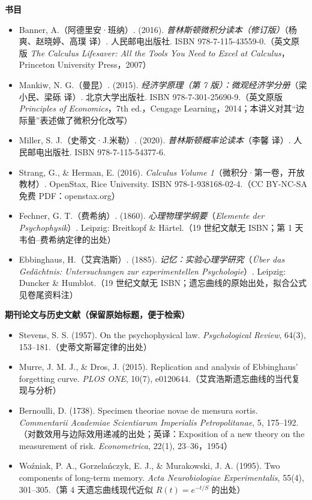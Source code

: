 \documentclass[UTF8,a4paper,11pt]{ctexart}
\begin{document}
\textbf{书目}
\begin{itemize}[label={}, leftmargin=2em, itemindent=-2em, itemsep=3pt]
  \item Banner, A.（阿德里安·班纳）. (2016). \emph{普林斯顿微积分读本（修订版）}（杨爽、赵晓婷、高璞 译）. 人民邮电出版社. ISBN 978-7-115-43559-0.（英文原版 \emph{The Calculus Lifesaver: All the Tools You Need to Excel at Calculus}，Princeton University Press，2007）
  \item Mankiw, N. G.（曼昆）. (2015). \emph{经济学原理（第 7 版）：微观经济学分册}（梁小民、梁砾 译）. 北京大学出版社. ISBN 978-7-301-25690-9.（英文原版 \emph{Principles of Economics}，7th ed.，Cengage Learning，2014；本讲义对其“边际量”表述做了微积分化改写）
  \item Miller, S. J.（史蒂文·J.米勒）. (2020). \emph{普林斯顿概率论读本}（李馨 译）. 人民邮电出版社. ISBN 978-7-115-54377-6.
  \item Strang, G., \& Herman, E. (2016). \emph{Calculus Volume 1}（微积分·第一卷，开放教材）. OpenStax, Rice University. ISBN 978-1-938168-02-4.（CC BY-NC-SA 免费 PDF：openstax.org）
  \item Fechner, G. T.（费希纳）. (1860). \emph{心理物理学纲要}（\emph{Elemente der Psychophysik}）. Leipzig: Breitkopf \& Härtel.（19 世纪文献无 ISBN；第 1 天韦伯–费希纳定律的出处）
  \item Ebbinghaus, H.（艾宾浩斯）. (1885). \emph{记忆：实验心理学研究}（\emph{Über das Gedächtnis: Untersuchungen zur experimentellen Psychologie}）. Leipzig: Duncker \& Humblot.（19 世纪文献无 ISBN；遗忘曲线的原始出处，拟合公式见卷尾资料注）
\end{itemize}

\textbf{期刊论文与历史文献（保留原始标题，便于检索）}
\begin{itemize}[label={}, leftmargin=2em, itemindent=-2em, itemsep=3pt]
  \item Stevens, S. S. (1957). On the psychophysical law. \emph{Psychological Review}, 64(3), 153--181.（史蒂文斯幂定律的出处）
  \item Murre, J. M. J., \& Dros, J. (2015). Replication and analysis of Ebbinghaus' forgetting curve. \emph{PLOS ONE}, 10(7), e0120644.（艾宾浩斯遗忘曲线的当代复现与分析）
  \item Bernoulli, D. (1738). Specimen theoriae novae de mensura sortis. \emph{Commentarii Academiae Scientiarum Imperialis Petropolitanae}, 5, 175--192.（对数效用与边际效用递减的出处；英译：Exposition of a new theory on the measurement of risk. \emph{Econometrica}, 22(1), 23--36，1954）
  \item Woźniak, P. A., Gorzelańczyk, E. J., \& Murakowski, J. A. (1995). Two components of long-term memory. \emph{Acta Neurobiologiae Experimentalis}, 55(4), 301--305.（第 4 天遗忘曲线现代近似 $R(t)=e^{-t/S}$ 的出处）
\end{itemize}
\end{document}
